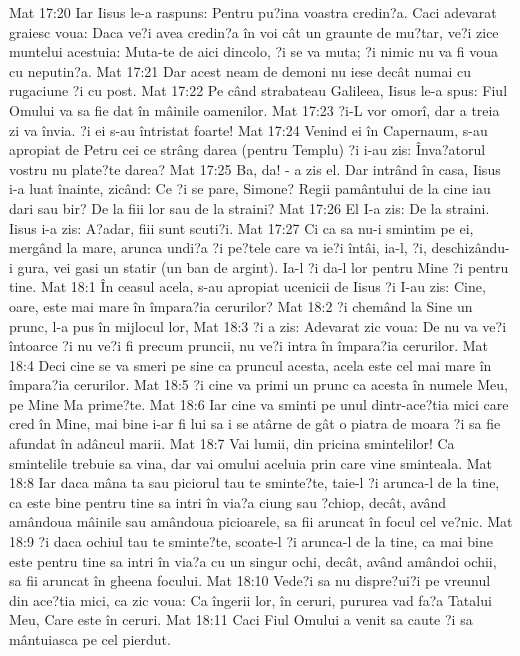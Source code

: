 Mat 17:20  Iar Iisus le-a raspuns: Pentru pu?ina voastra credin?a. Caci adevarat graiesc voua: Daca ve?i avea credin?a în voi cât un graunte de mu?tar, ve?i zice muntelui acestuia: Muta-te de aici dincolo, ?i se va muta; ?i nimic nu va fi voua cu neputin?a.
Mat 17:21  Dar acest neam de demoni nu iese decât numai cu rugaciune ?i cu post.
Mat 17:22  Pe când strabateau Galileea, Iisus le-a spus: Fiul Omului va sa fie dat în mâinile oamenilor.
Mat 17:23  ?i-L vor omorî, dar a treia zi va învia. ?i ei s-au întristat foarte!
Mat 17:24  Venind ei în Capernaum, s-au apropiat de Petru cei ce strâng darea (pentru Templu) ?i i-au zis: Înva?atorul vostru nu plate?te darea?
Mat 17:25  Ba, da! - a zis el. Dar intrând în casa, Iisus i-a luat înainte, zicând: Ce ?i se pare, Simone? Regii pamântului de la cine iau dari sau bir? De la fiii lor sau de la straini?
Mat 17:26  El I-a zis: De la straini. Iisus i-a zis: A?adar, fiii sunt scuti?i.
Mat 17:27  Ci ca sa nu-i smintim pe ei, mergând la mare, arunca undi?a ?i pe?tele care va ie?i întâi, ia-l, ?i, deschizându-i gura, vei gasi un statir (un ban de argint). Ia-l ?i da-l lor pentru Mine ?i pentru tine.
Mat 18:1  În ceasul acela, s-au apropiat ucenicii de Iisus ?i I-au zis: Cine, oare, este mai mare în împara?ia cerurilor?
Mat 18:2  ?i chemând la Sine un prunc, l-a pus în mijlocul lor,
Mat 18:3  ?i a zis: Adevarat zic voua: De nu va ve?i întoarce ?i nu ve?i fi precum pruncii, nu ve?i intra în împara?ia cerurilor.
Mat 18:4  Deci cine se va smeri pe sine ca pruncul acesta, acela este cel mai mare în împara?ia cerurilor.
Mat 18:5  ?i cine va primi un prunc ca acesta în numele Meu, pe Mine Ma prime?te.
Mat 18:6  Iar cine va sminti pe unul dintr-ace?tia mici care cred în Mine, mai bine i-ar fi lui sa i se atârne de gât o piatra de moara ?i sa fie afundat în adâncul marii.
Mat 18:7  Vai lumii, din pricina smintelilor! Ca smintelile trebuie sa vina, dar vai omului aceluia prin care vine sminteala.
Mat 18:8  Iar daca mâna ta sau piciorul tau te sminte?te, taie-l ?i arunca-l de la tine, ca este bine pentru tine sa intri în via?a ciung sau ?chiop, decât, având amândoua mâinile sau amândoua picioarele, sa fii aruncat în focul cel ve?nic.
Mat 18:9  ?i daca ochiul tau te sminte?te, scoate-l ?i arunca-l de la tine, ca mai bine  este pentru tine sa intri în via?a cu un singur ochi, decât, având amândoi ochii, sa fii aruncat în gheena focului.
Mat 18:10  Vede?i sa nu dispre?ui?i pe vreunul din ace?tia mici, ca zic voua: Ca îngerii lor, în ceruri, pururea vad fa?a Tatalui Meu, Care este în ceruri.
Mat 18:11  Caci Fiul Omului a venit sa caute ?i sa mântuiasca pe cel pierdut.
